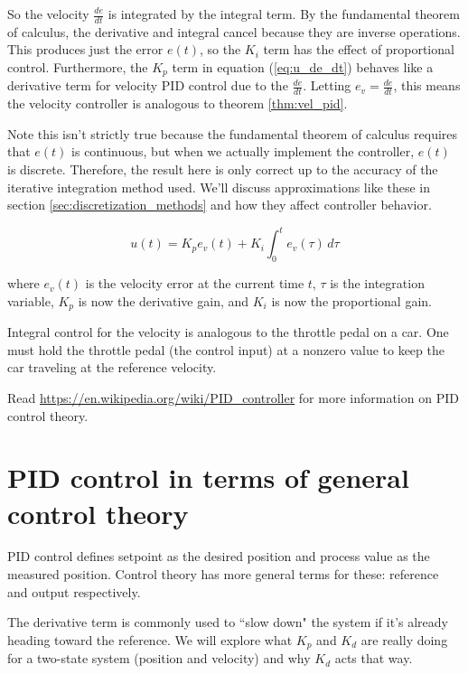 So the velocity $\frac{de}{dt}$ is integrated by the integral term. By the
fundamental theorem of calculus, the derivative and integral cancel because they
are inverse operations. This produces just the error $e(t)$, so the $K_i$ term
has the effect of proportional control. Furthermore, the $K_p$ term in equation
(\ref{eq:u_de_dt}) behaves like a derivative term for velocity PID control due
to the $\frac{de}{dt}$. Letting $e_v = \frac{de}{dt}$, this means the velocity
controller is analogous to theorem \ref{thm:vel_pid}.

Note this isn't strictly true because the fundamental theorem of calculus
requires that $e(t)$ is continuous, but when we actually implement the
controller, $e(t)$ is discrete. Therefore, the result here is only correct up to
the accuracy of the iterative integration method used. We'll discuss
approximations like these in section \ref{sec:discretization_methods} and how
they affect controller behavior.

\begin{theorem}
  \label{thm:vel_pid}

  \begin{equation}
    u(t) = K_p e_v(t) + K_i \int_0^t e_v(\tau) \,d\tau
  \end{equation}

  where $e_v(t)$ is the velocity error at the current time $t$, $\tau$ is the
  integration variable, $K_p$ is now the derivative gain, and $K_i$ is now the
  proportional gain.
\end{theorem}

Integral control for the velocity is analogous to the throttle pedal on a car.
One must hold the throttle pedal (the control input) at a nonzero value to keep
the car traveling at the reference velocity.

Read \url{https://en.wikipedia.org/wiki/PID_controller} for more information on
PID control theory.

\section{PID control in terms of general control theory}

PID control defines \gls{setpoint} as the desired position and
\gls{process value} as the measured position. Control theory has more general
terms for these: \gls{reference} and \gls{output} respectively.

The derivative term is commonly used to ``slow down" the \gls{system} if it's
already heading toward the \gls{reference}. We will explore what $K_p$ and $K_d$
are really doing for a two-state \gls{system} (position and velocity) and why
$K_d$ acts that way.

